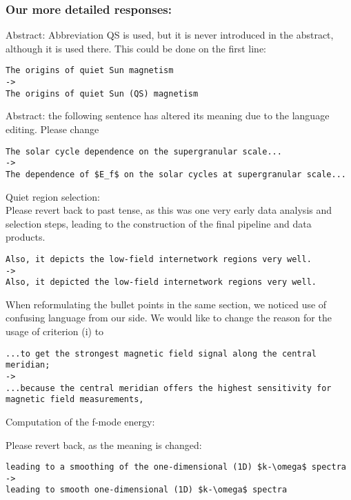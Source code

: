 \documentclass[a4]{article}
\begin{document}
\subsubsection*{Our more detailed responses:}

\noindent Abstract: Abbreviation QS is used, but it is never introduced in the abstract, although it is used there. This could be done on the first line:

\begin{verbatim}
The origins of quiet Sun magnetism 
-> 
The origins of quiet Sun (QS) magnetism \end{verbatim}

\noindent Abstract: the following sentence has altered its meaning due to the language editing. Please change

\begin{verbatim}
The solar cycle dependence on the supergranular scale...
->
The dependence of $E_f$ on the solar cycles at supergranular scale...
\end{verbatim}

 Quiet region selection: \\

\noindent Please revert back to past tense, as this was one very early data
analysis and selection steps, leading to the construction of the final
pipeline and data products.

\begin{verbatim}
Also, it depicts the low-field internetwork regions very well.
->
Also, it depicted the low-field internetwork regions very well.
\end{verbatim}

\noindent When reformulating the bullet points in the same section, we noticed use of confusing language from our side. We would like to change the reason for the usage of criterion (i) to

\begin{verbatim}
...to get the strongest magnetic field signal along the central meridian;
->
...because the central meridian offers the highest sensitivity for 
magnetic field measurements,
\end{verbatim}

 Computation of the f-mode energy:

\noindent Please revert back, as the meaning is changed:

\begin{verbatim}
leading to a smoothing of the one-dimensional (1D) $k-\omega$ spectra
->
leading to smooth one-dimensional (1D) $k-\omega$ spectra
\end{verbatim}
\end{document}
